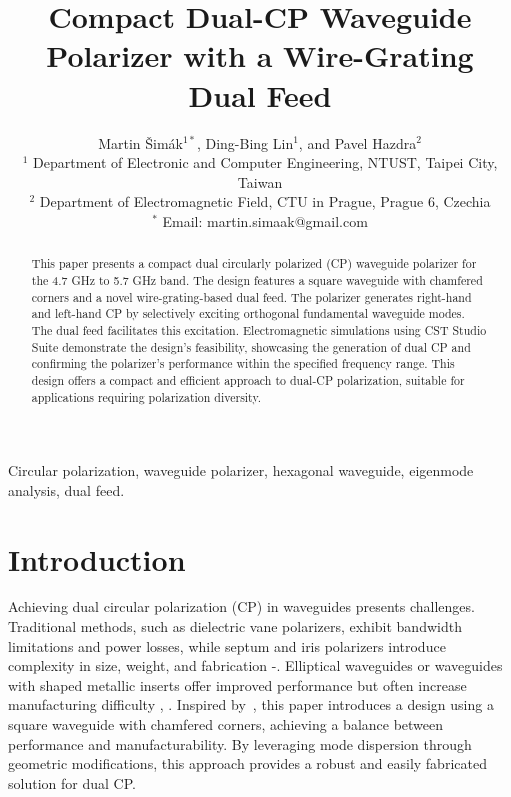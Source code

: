 \documentclass[conference,a4paper]{isap2025}
\title{Compact Dual-CP Waveguide Polarizer with a Wire-Grating Dual Feed}
\author{
Martin Šimák$^{1*}$, Ding-Bing Lin$^1$, and Pavel Hazdra$^2$
\\
$^1$ Department of Electronic and Computer Engineering, NTUST, Taipei City, Taiwan
\\
$^2$ Department of Electromagnetic Field, CTU in Prague, Prague 6, Czechia
\\
$^*$ Email: martin.simaak@gmail.com
}
\begin{document}
\baselineskip 4.5mm

\maketitle

\begin{abstract}
This paper presents a compact dual circularly polarized (CP) waveguide polarizer for the 4.7 GHz to 5.7 GHz band.  The design features a square waveguide with chamfered corners and a novel wire-grating-based dual feed.  The polarizer generates right-hand and left-hand CP by selectively exciting orthogonal fundamental waveguide modes. The dual feed facilitates this excitation.  Electromagnetic simulations using CST Studio Suite demonstrate the design's feasibility, showcasing the generation of dual CP and confirming the polarizer's performance within the specified frequency range. This design offers a compact and efficient approach to dual-CP polarization, suitable for applications requiring polarization diversity.
\end{abstract}

\begin{IEEEkeywords}
Circular polarization, waveguide polarizer, hexagonal waveguide, eigenmode analysis, dual feed.
\end{IEEEkeywords}


\section{Introduction}
Achieving dual circular polarization (CP) in waveguides presents challenges. Traditional methods, such as dielectric vane polarizers, exhibit bandwidth limitations and power losses, while septum and iris polarizers introduce complexity in size, weight, and fabrication \cite{ruiz-cruz-et-al:compact-reconfigurable-waveguide-circular-polarizer}-\cite{virone-et-al:optimum-iris-set-concept-for-waveguide-polarizers}. Elliptical waveguides or waveguides with shaped metallic inserts offer improved performance but often increase manufacturing difficulty \cite{yu-et-al:a-wideband-circularly-polarized-horn-antenna-with-a-tapered-elliptical-waveguide-polarizer}, \cite{rud-shpachenko:polarizers-on-sections-of-square-waveguides-with-inner-corner-ridges}.  Inspired by~\cite{bhardwaj-volakis:hexagonal-waveguides-new-class-of-waveguides-for-mmwave-circularly-polarized-horns}, this paper introduces a design using a square waveguide with chamfered corners, achieving a balance between performance and manufacturability.  By leveraging mode dispersion through geometric modifications, this approach provides a robust and easily fabricated solution for dual CP.
\end{document}
